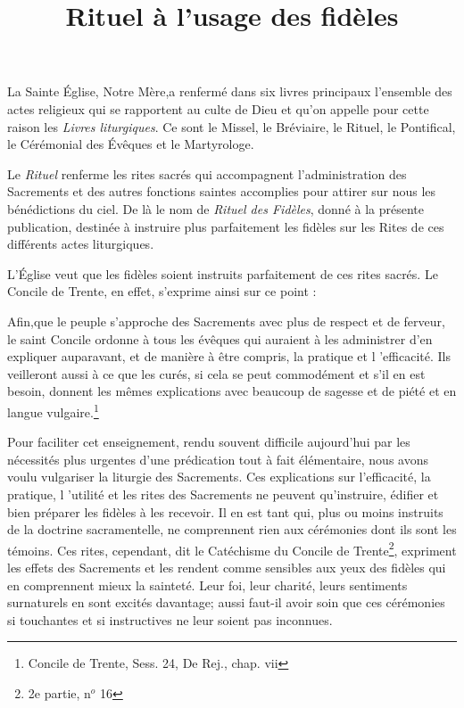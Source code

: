 \documentclass[%
fontsize=12%
,a5paper%
,DIV=15%
]{scrartcl}
\title{Rituel à l'usage des fidèles}
\author{}
\date{}
\begin{document}
\maketitle
{}
La Sainte Église, Notre Mère,a renfermé dans six livres principaux
l'ensemble des actes religieux qui se rapportent au
culte de Dieu et qu'on appelle pour cette raison les \emph{Livres
liturgiques}. Ce sont le Missel, le Bréviaire, le Rituel, le Pontifical,
le Cérémonial des Évêques et le Martyrologe.

Le \emph{Rituel} renferme les rites sacrés qui accompagnent l'administration
des Sacrements et des autres fonctions saintes accomplies
pour attirer sur nous les bénédictions du ciel. De là
le nom de \emph{Rituel des Fidèles}, donné à la présente publication,
destinée à instruire plus parfaitement les fidèles sur les Rites
de ces différents actes liturgiques.

L'Église veut que les fidèles soient instruits parfaitement
de ces rites sacrés. Le Concile de Trente, en effet, s'exprime
ainsi sur ce point  :

\og Afin,que le peuple s'approche des Sacrements avec plus
de respect et de ferveur, le saint Concile ordonne à tous les
évêques qui auraient à les administrer d'en expliquer auparavant,
et de manière à être compris, la pratique et l 'efficacité.
Ils veilleront aussi à ce que les curés, si cela se peut commodément
et s'il en est besoin, donnent les mêmes explications avec
beaucoup de sagesse et de piété et en langue vulgaire.\fg \footnote{Concile de Trente, Sess. 24, De Rej., chap. vii}

Pour faciliter cet enseignement, rendu souvent difficile
aujourd'hui par les nécessités plus urgentes d'une prédication
tout à fait élémentaire, nous avons voulu vulgariser la liturgie
des Sacrements. Ces explications sur l'efficacité, la pratique,
l 'utilité et les rites des Sacrements ne peuvent qu'instruire,
édifier et bien préparer les fidèles à les recevoir. Il en est tant
qui, plus ou moins instruits de la doctrine sacramentelle, ne
comprennent rien aux cérémonies dont ils sont les témoins.
\og Ces rites, cependant, dit le Catéchisme du Concile de Trente\footnote{2e partie, n$^o$ 16}, expriment les effets des Sacrements et les
rendent comme sensibles aux yeux des fidèles qui en comprennent mieux la sainteté. Leur foi, leur charité, leurs sentiments
surnaturels en sont excités davantage; aussi faut-il
avoir soin que ces cérémonies si touchantes et si instructives
ne leur soient pas inconnues.\fg
\end{document}
